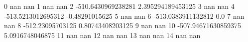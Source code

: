 0 nan nan
1 nan nan
2 -510.6430969238281 2.395294189453125
3 nan nan
4 -513.5213012695312 -0.48291015625
5 nan nan
6 -513.0383911132812 0.0
7 nan nan
8 -512.23095703125 0.80743408203125
9 nan nan
10 -507.94671630859375 5.0916748046875
11 nan nan
12 nan nan
13 nan nan
14 nan nan
